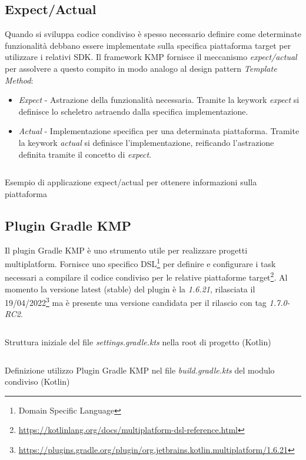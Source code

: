\subsection{Expect/Actual}
Quando si sviluppa codice condiviso è spesso necessario definire come determinate funzionalità debbano essere implementate sulla specifica piattaforma target per utilizzare i relativi SDK. Il framework KMP fornisce il meccanismo \textit{expect/actual} per assolvere a questo compito in modo analogo al design pattern \textit{Template Method}:
\begin{itemize}
    \item \textit{Expect} - Astrazione della funzionalità necessaria. Tramite la keywork \textit{expect} si definisce lo scheletro astraendo dalla specifica implementazione.
    \item \textit{Actual} - Implementazione specifica per una determinata piattaforma. Tramite la keywork \textit{actual} si definisce l'implementazione, reificando l'astrazione definita tramite il concetto di \textit{expect}.
\end{itemize}

\begin{listing}[H]
\inputminted{kotlin}{code/3-expectactual}
\caption{Esempio di applicazione expect/actual per ottenere informazioni sulla piattaforma}
\end{listing}

\subsection{Plugin Gradle KMP}
Il plugin Gradle KMP è uno strumento utile per realizzare progetti multiplatform. Fornisce uno specifico DSL\footnote{Domain Specific Language} per definire e configurare i task necessari a compilare il codice condiviso per le relative piattaforme target\footnote{\url{https://kotlinlang.org/docs/multiplatform-dsl-reference.html}}. Al momento la versione latest (stable) del plugin è la \textit{1.6.21}, rilasciata il 19/04/2022\footnote{\url{https://plugins.gradle.org/plugin/org.jetbrains.kotlin.multiplatform/1.6.21}} ma è presente una versione candidata per il rilascio con tag \textit{1.7.0-RC2}.

\begin{listing}[H]
\inputminted{kotlin}{code/3-gradlekmm1}
\caption{Struttura iniziale del file \textit{settings.gradle.kts} nella root di progetto (Kotlin)}
\end{listing}

\begin{listing}[H]
\inputminted{kotlin}{code/3-gradlekmm2}
\caption{Definizione utilizzo Plugin Gradle KMP nel file \textit{build.gradle.kts} del modulo condiviso (Kotlin)}
\end{listing}

